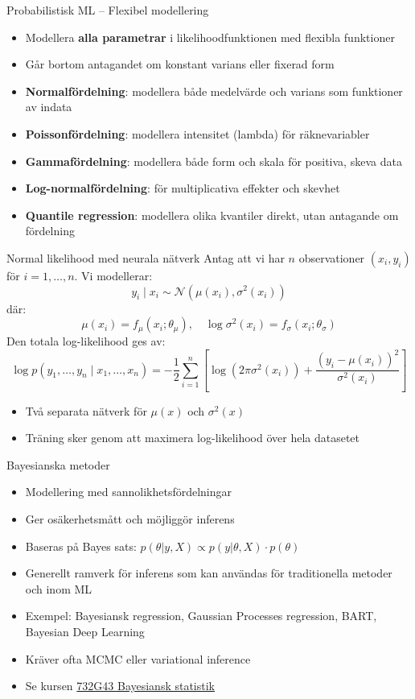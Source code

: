 \documentclass[10pt,english]{beamer}
\begin{document}
\begin{frame}{Probabilistisk ML – Flexibel modellering}
  \begin{itemize}
    \item Modellera \textbf{alla parametrar} i likelihoodfunktionen med flexibla funktioner
    \item Går bortom antagandet om konstant varians eller fixerad form
    \item \textbf{Normalfördelning}: modellera både medelvärde och varians som funktioner av indata
    \item \textbf{Poissonfördelning}: modellera intensitet (lambda) för räknevariabler
    \item \textbf{Gammafördelning}: modellera både form och skala för positiva, skeva data
    \item \textbf{Log-normalfördelning}: för multiplicativa effekter och skevhet
    \item \textbf{Quantile regression}: modellera olika kvantiler direkt, utan antagande om fördelning
  \end{itemize}
\end{frame}


\begin{frame}{Normal likelihood med neurala nätverk}
  Antag att vi har $n$ observationer $(x_i, y_i)$ för $i = 1, \dots, n$. Vi modellerar:
  \[
  y_i \mid x_i \sim \mathcal{N}(\mu(x_i), \sigma^2(x_i))
  \]
  där:
  \[
  \mu(x_i) = f_\mu(x_i; \theta_\mu), \quad \log \sigma^2(x_i) = f_\sigma(x_i; \theta_\sigma)
  \]
  Den totala log-likelihood ges av:
  \[
  \log p(y_1, \dots, y_n \mid x_1, \dots, x_n) = 
  -\frac{1}{2} \sum_{i=1}^n \left[ \log(2\pi \sigma^2(x_i)) + \frac{(y_i - \mu(x_i))^2}{\sigma^2(x_i)} \right]
  \]
  \begin{itemize}
    \item Två separata nätverk för $\mu(x)$ och $\sigma^2(x)$
    \item Träning sker genom att maximera log-likelihood över hela datasetet
  \end{itemize}
\end{frame}

\begin{frame}{Bayesianska metoder}
  \begin{itemize}
    \item Modellering med sannolikhetsfördelningar
    \item Ger osäkerhetsmått och möjliggör inferens
    \item Baseras på Bayes sats: $p(\theta |y,X) \propto p(y|\theta,X) \cdot p(\theta)$
    \item Generellt ramverk för inferens som kan användas för traditionella metoder och inom ML
    \item Exempel: Bayesiansk regression, Gaussian Processes regression, BART, Bayesian Deep Learning
    \item Kräver ofta MCMC eller variational inference
    \item Se kursen  \href{https://studieinfo.liu.se/kurs/732G43}{732G43 Bayesiansk statistik}
  \end{itemize}
\end{frame}
\end{document}
